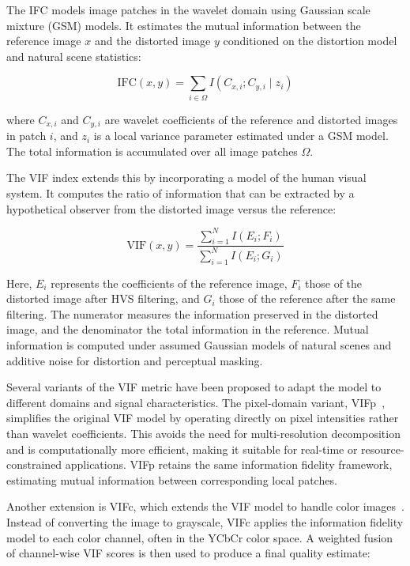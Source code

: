 The IFC models image patches in the wavelet domain using Gaussian scale mixture (GSM) models. It estimates the mutual information between the reference image $x$ and the distorted image $y$ conditioned on the distortion model and natural scene statistics:

\begin{equation}
\text{IFC}(x, y) = \sum_{i \in \Omega} I(C_{x,i}; C_{y,i} \mid z_i)
\end{equation}

where $C_{x,i}$ and $C_{y,i}$ are wavelet coefficients of the reference and distorted images in patch $i$, and $z_i$ is a local variance parameter estimated under a GSM model. The total information is accumulated over all image patches $\Omega$.

The VIF index extends this by incorporating a model of the human visual system. It computes the ratio of information that can be extracted by a hypothetical observer from the distorted image versus the reference:

\begin{equation}
\text{VIF}(x, y) = \frac{\sum_{i=1}^{N} I(E_i; F_i)}{\sum_{i=1}^{N} I(E_i; G_i)}
\end{equation}

Here, $E_i$ represents the coefficients of the reference image, $F_i$ those of the distorted image after HVS filtering, and $G_i$ those of the reference after the same filtering. The numerator measures the information preserved in the distorted image, and the denominator the total information in the reference. Mutual information is computed under assumed Gaussian models of natural scenes and additive noise for distortion and perceptual masking.

Several variants of the VIF metric have been proposed to adapt the model to different domains and signal characteristics. The pixel-domain variant, VIFp~\cite{Sheikh2005VIFp}, simplifies the original VIF model by operating directly on pixel intensities rather than wavelet coefficients. This avoids the need for multi-resolution decomposition and is computationally more efficient, making it suitable for real-time or resource-constrained applications. VIFp retains the same information fidelity framework, estimating mutual information between corresponding local patches.

Another extension is VIFc, which extends the VIF model to handle color images~\cite{Sheikh2006VIF}. Instead of converting the image to grayscale, VIFc applies the information fidelity model to each color channel, often in the YCbCr color space. A weighted fusion of channel-wise VIF scores is then used to produce a final quality estimate:

